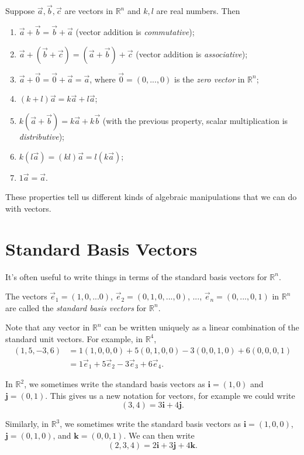 \documentclass{ximera}
\begin{document}
\begin{proposition}
Suppose $\vec{a},\vec{b},\vec{c}$ are vectors in $\mathbb{R}^n$ and $k,l$ are real numbers. Then 
\begin{enumerate}
\item $\vec{a}+\vec{b} = \vec{b}+\vec{a}$ (vector addition is \emph{commutative});
\item $\vec{a}+(\vec{b}+\vec{c}) = (\vec{a}+\vec{b})+\vec{c}$ (vector addition is \emph{associative});
\item $\vec{a}+\vec{0} = \vec{0}+\vec{a} = \vec{a}$, where $\vec{0} = (0,...,0)$ is the \emph{zero vector} in $\mathbb{R}^n$;
\item $(k+l)\vec{a} = k\vec{a}+l\vec{a}$;
\item $k(\vec{a}+\vec{b}) = k\vec{a}+k\vec{b}$ (with the previous property, scalar multiplication is \emph{distributive});
\item $k(l\vec{a})=(kl)\vec{a} = l(k\vec{a})$;
\item $1\vec{a} = \vec{a}$.
\end{enumerate}
\end{proposition}

These properties tell us different kinds of algebraic manipulations that we can do with vectors.

\section*{Standard Basis Vectors}

It's often useful to write things in terms of the standard basis vectors for $\mathbb{R}^n$.

\begin{definition}
The vectors $\vec{e}_1 = (1,0,...0)$, $\vec{e}_2 = (0,1,0,...,0)$, ..., $\vec{e}_n = (0,...,0,1)$ in $\mathbb{R}^n$ are called the \emph{standard basis vectors} for $\mathbb{R}^n$.
\end{definition}

Note that any vector in $\mathbb{R}^n$ can be written uniquely as a linear combination of the standard unit vectors. For example, in $\mathbb{R}^4$,
\begin{align*}
(1,5,-3,6) &= 1(1,0,0,0)+5(0,1,0,0)-3(0,0,1,0)+6(0,0,0,1)\\
&= 1\vec{e}_1+5\vec{e}_2-3\vec{e}_3+6\vec{e}_4.
\end{align*}

In $\mathbb{R}^2$, we sometimes write the standard basis vectors as $\mathbf{i} = (1,0)$ and $\mathbf{j} = (0,1)$. This gives us a new notation for vectors, for example we could write
\[
(3,4) = 3\mathbf{i}+4\mathbf{j}.
\]

Similarly, in $\mathbb{R}^3$, we sometimes write the standard basis vectors as $\mathbf{i} = (1,0,0)$, $\mathbf{j} = (0,1,0)$, and $\mathbf{k} = (0,0,1)$. We can then write
\[
(2,3,4) = 2\mathbf{i}+3\mathbf{j}+4\mathbf{k}.
\]
\end{document}
